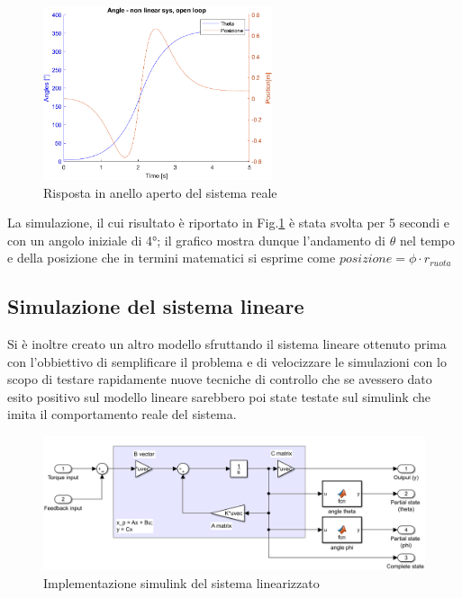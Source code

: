 \begin{figure}[H]
	\centering   	
	\includegraphics[width=0.6\textwidth]{Immagini/open_loop_response_non_linear.png}
	\caption{Risposta in anello aperto del sistema reale}
	\label{fig:open_loop_response_non_linear}
\end{figure}
La simulazione, il cui risultato è riportato in Fig.\ref{fig:open_loop_response_non_linear} è stata svolta per 5 secondi e con un angolo iniziale di 4°; il grafico mostra dunque l'andamento di $\theta$ nel tempo e della posizione che in termini matematici si esprime come $posizione = \phi \cdot{r_{ruota}}$
\label{sec:simulazione_reale}
\subsection{Simulazione del sistema lineare}
Si è inoltre creato un altro modello sfruttando il sistema lineare ottenuto prima  con l'obbiettivo di semplificare il problema e di velocizzare le simulazioni con lo scopo di testare rapidamente nuove tecniche di controllo che se avessero dato esito positivo sul modello lineare sarebbero poi state testate sul simulink che imita il comportamento reale del sistema.
\begin{figure}[H]
	\centering   	
	\includegraphics[width=1\textwidth]{Immagini/linear_system.png}
	\caption{Implementazione simulink del sistema linearizzato}
	\label{fig:linear_system}
\end{figure}

